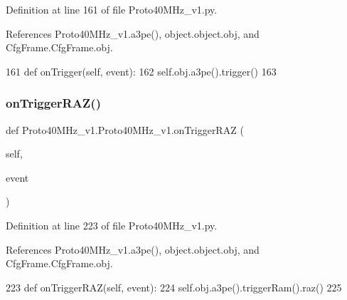 Definition at line 161 of file Proto40\+M\+Hz\+\_\+v1.\+py.



References Proto40\+M\+Hz\+\_\+v1.\+a3pe(), object.\+object.\+obj, and Cfg\+Frame.\+Cfg\+Frame.\+obj.


\begin{DoxyCode}
161     \textcolor{keyword}{def }onTrigger(self, event):
162         self.obj.a3pe().trigger()
163 
\end{DoxyCode}
\mbox{\label{classProto40MHz__v1_1_1Proto40MHz__v1_a6eaf9957a2db9ea41e3cb80625fbd8c9}} 
\subsubsection{\texorpdfstring{on\+Trigger\+R\+A\+Z()}{onTriggerRAZ()}}
{\footnotesize\ttfamily def Proto40\+M\+Hz\+\_\+v1.\+Proto40\+M\+Hz\+\_\+v1.\+on\+Trigger\+R\+AZ (\begin{DoxyParamCaption}\item[{}]{self,  }\item[{}]{event }\end{DoxyParamCaption})}



Definition at line 223 of file Proto40\+M\+Hz\+\_\+v1.\+py.



References Proto40\+M\+Hz\+\_\+v1.\+a3pe(), object.\+object.\+obj, and Cfg\+Frame.\+Cfg\+Frame.\+obj.


\begin{DoxyCode}
223     \textcolor{keyword}{def }onTriggerRAZ(self, event):
224         self.obj.a3pe().triggerRam().raz()
225 
\end{DoxyCode}
\mbox{\label{classProto40MHz__v1_1_1Proto40MHz__v1_a6d03147c7dc0b36d7e7b3405c625ce1c}} 
